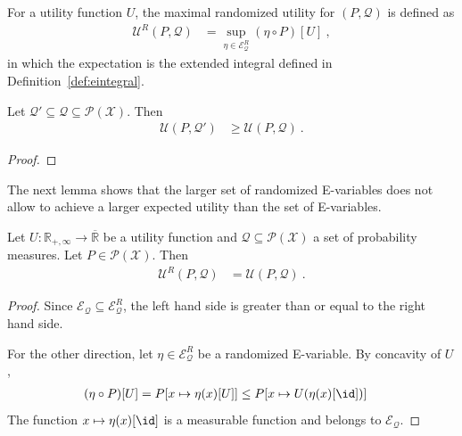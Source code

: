 \begin{definition}\label{def:maxRandUtility}
  \leanok
For a utility function $U$, the maximal randomized utility for $(P, \mathcal{Q})$ is defined as
\begin{align*}
  \mathcal{U}^R(P, \mathcal{Q})
  &= \sup_{\eta \in \mathcal{E}^R_{\mathcal{Q}}} (\eta \circ P)[U]
  \: ,
\end{align*}
in which the expectation is the extended integral defined in Definition~\ref{def:eintegral}.
\end{definition}


\begin{lemma}\label{lem:maxUtility_anti}
  \leanok
Let $\mathcal{Q}' \subseteq \mathcal{Q} \subseteq \mathcal{P}(\mathcal{X})$.
Then
\begin{align*}
  \mathcal{U}(P, \mathcal{Q}')
  &\ge \mathcal{U}(P, \mathcal{Q})
  \: .
\end{align*}
\end{lemma}

\begin{proof}\leanok

\end{proof}


The next lemma shows that the larger set of randomized E-variables does not allow to achieve a larger expected utility than the set of E-variables.

\begin{lemma}\label{lem:maxRandUtility_eq_maxUtility}
  \leanok
Let $U : \mathbb{R}_{+,\infty} \to \overline{\mathbb{R}}$ be a utility function and $\mathcal{Q} \subseteq \mathcal{P}(\mathcal{X})$ a set of probability measures.
Let $P \in \mathcal{P}(\mathcal{X})$. Then
\begin{align*}
  \mathcal{U}^R(P, \mathcal{Q})
  &= \mathcal{U}(P, \mathcal{Q})
  \: .
\end{align*}
\end{lemma}

\begin{proof}\leanok
Since $\mathcal{E}_{\mathcal{Q}} \subseteq \mathcal{E}^R_{\mathcal{Q}}$, the left hand side is greater than or equal to the right hand side.

For the other direction, let $\eta \in \mathcal{E}^R_{\mathcal{Q}}$ be a randomized E-variable.
By concavity of $U$,
\begin{align*}
  (\eta \circ P)[U]
  &= P[x \mapsto \eta(x)[U]]
  \le P[x \mapsto U(\eta(x)[\id])]
\end{align*}
The function $x \mapsto \eta(x)[\id]$ is a measurable function and belongs to $\mathcal{E}_{\mathcal{Q}}$.
\end{proof}


